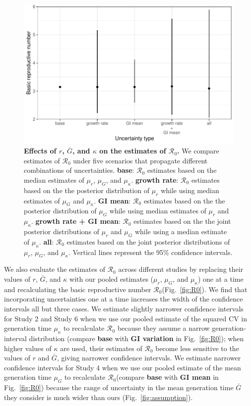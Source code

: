 \documentclass[12pt]{article}
\newcommand{\fref}[1]{Fig.~\ref{fig:#1}}
\newcommand{\Rx}[1]{\ensuremath{{\mathcal R}_{#1}}}
\newcommand{\Ro}{\Rx{0}\xspace}
\begin{document}
\begin{figure}[!ht]
\includegraphics[width=\textwidth]{figure2.pdf}
\caption{
\textbf{Effects of $r$, $\bar G$, and $\kappa$ on the estimates of \Ro.}
We compare estimates of \Ro under five scenarios that propagate different combinations of uncertainties.
\textbf{base}: \Ro estimates based on the median estimates of $\mu_r$, $\mu_G$, and $\mu_\kappa$.
\textbf{growth rate}: \Ro estimates based on the the posterior distribution of $\mu_r$ while using median estimates of $\mu_G$ and $\mu_\kappa$.
\textbf{GI mean}: \Ro estimates based on the the posterior distribution of $\mu_G$ while using median estimates of $\mu_r$ and $\mu_\kappa$.
\textbf{growth rate + GI mean}: \Ro estimates based on the the joint posterior distributions of $\mu_r$ and $\mu_G$ while using a median estimate of $\mu_\kappa$.
\textbf{all}: \Ro estimates based on the joint posterior distributions of  $\mu_r$, $\mu_G$, and $\mu_\kappa$.
Vertical lines represent the 95\% confidence intervals.
}
\label{fig:eff}
\end{figure}

We also evaluate the estimates of \Ro across different studies by 
replacing their values of $r$, $\bar G$, and $\kappa$ with our pooled estimates ($\mu_r$, $\mu_G$, and $\mu_\kappa$) one at a time and recalculating the basic reproductive number \Ro (\fref{R0}).
We find that incorporating uncertainties one at a time increases the width of the confidence intervals all but three cases.
We estimate slightly narrower confidence intervals for Study 2 and Study 6 when we use our pooled estimate of the squared CV in generation time $\mu_\kappa$ to recalculate \Ro because they assume a narrow generation-interval distribution (compare \textbf{base} with \textbf{GI variation} in \fref{R0});
when higher values of $\kappa$ are used, their estimates of \Ro become less sensitive to the values of $r$ and $\bar G$, giving narrower confidence intervals.
We estimate narrower confidence intervals for Study 4 when we use our pooled estimate of the mean generation time $\mu_G$ to recalculate \Ro (compare \textbf{base} with \textbf{GI mean} in \fref{R0}) because the range of uncertainty in the mean generation time $\bar G$ they consider is much wider than ours (\fref{assumption}).
\end{document}
